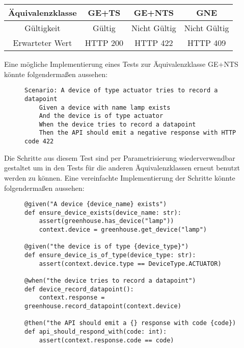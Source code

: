 \begin{center}
    \begin{tabular}{|c||c|c|c|}
        \hline
        Äquivalenzklasse&GE+TS&GE+NTS&GNE\\
        \hline
        Gültigkeit&Gültig&Nicht Gültig&Nicht Gültig\\
        \hline
        Erwarteter Wert&HTTP 200&HTTP 422&HTTP 409\\
        \hline
    \end{tabular}
\end{center}

Eine mögliche Implementierung eines Tests zur Äquivalenzklasse GE+NTS könnte folgendermaßen aussehen:

\begin{figure}[H]
    \begin{verbatim}
Scenario: A device of type actuator tries to record a datapoint
    Given a device with name lamp exists
    And the device is of type actuator
    When the device tries to record a datapoint
    Then the API should emit a negative response with HTTP code 422
    \end{verbatim}
\end{figure}

Die Schritte aus diesem Test sind per Parametrisierung wiederverwendbar gestaltet um in den Tests für die anderen Äquivalenzklassen erneut benutzt werden zu können.
Eine vereinfachte Implementierung der Schritte könnte folgendermaßen aussehen:
\begin{figure}[H]
    \begin{verbatim}
@given("A device {device_name} exists")
def ensure_device_exists(device_name: str):
    assert(greenhouse.has_device("lamp")) 
    context.device = greenhouse.get_device("lamp")

@given("the device is of type {device_type}")
def ensure_device_is_of_type(device_type: str):
    assert(context.device.type == DeviceType.ACTUATOR)

@when("the device tries to record a datapoint")
def device_record_datapoint():
    context.response = greenhouse.record_datapoint(context.device)

@then("the API should emit a {} response with code {code})
def api_should_respond_with(code: int):
    assert(context.response.code == code)
    \end{verbatim}
\end{figure}